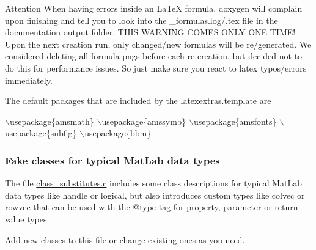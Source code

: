 \begin{DoxyAttention}{Attention}
When having errors inside an La\+Te\+X formula, doxygen will complain upon finishing and tell you to look into the \+\_\+formulas.\+log/.tex file in the documentation output folder. T\+H\+I\+S W\+A\+R\+N\+I\+N\+G C\+O\+M\+E\+S O\+N\+L\+Y O\+N\+E T\+I\+M\+E! Upon the next creation run, only changed/new formulas will be re/generated. We considered deleting all formula pngs before each re-\/creation, but decided not to do this for performance issues. So just make sure you react to latex typos/errors immediately.
\end{DoxyAttention}
The default packages that are included by the {\ttfamily latexextras.\+template} are 
\begin{DoxyCode}
\(\backslash\)usepackage\{amsmath\}
\(\backslash\)usepackage\{amssymb\}
\(\backslash\)usepackage\{amsfonts\}
\(\backslash\)usepackage\{subfig\}
\(\backslash\)usepackage\{bbm\} 
\end{DoxyCode}
\hypertarget{tools_config_fakeclasses}{}\subsubsection{Fake classes for typical Mat\+Lab data types}\label{tools_config_fakeclasses}
The file {\ttfamily \hyperlink{class__substitutes_8c_source}{class\+\_\+substitutes.\+c}} includes some class descriptions for typical Mat\+Lab data types like handle or logical, but also introduces custom types like colvec or rowvec that can be used with the @type tag for property, parameter or return value types.

Add new classes to this file or change existing ones as you need. 